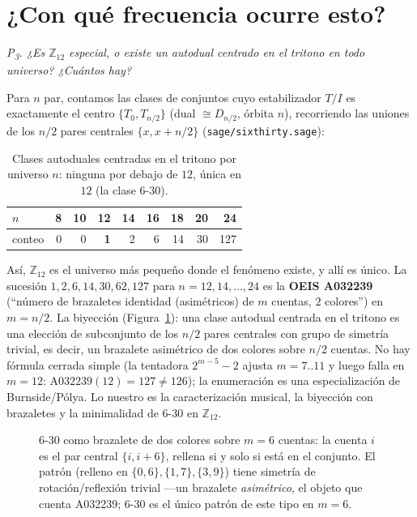 \documentclass[11pt]{article}
\newcommand{\lean}[1]{\texttt{#1}}
\newcommand{\Ztwelve}{\mathbb{Z}_{12}}
\newcommand{\Dgrp}[1]{D_{#1}}
\newcommand{\question}[1]{\smallskip\noindent\textit{#1}\smallskip}
\begin{document}
\section{¿Con qué frecuencia ocurre esto?}\label{sec:enum}

\question{P\textsubscript{3}. ¿Es $\Ztwelve$ especial, o existe un autodual centrado en el tritono en
todo universo? ¿Cuántos hay?}

Para $n$ par, contamos las clases de conjuntos cuyo estabilizador $T/I$ es exactamente el centro
$\{T_0,T_{n/2}\}$ (dual $\cong\Dgrp{n/2}$, órbita $n$), recorriendo las uniones de los $n/2$ pares
centrales $\{x,x+n/2\}$ (\lean{sage/sixthirty.sage}):

\begin{table}[h]
\centering
{}
\begin{tabular}{lrrrrrrrr}
\toprule
\rowcolor{ctA!22}
$n$    & 8 & 10 & \textbf{12} & 14 & 16 & 18 & 20 & 24\\
\midrule
conteo & 0 & 0  & \textbf{1}  & 2  & 6  & 14 & 30 & 127\\
\bottomrule
\end{tabular}
\caption{Clases autoduales centradas en el tritono por universo $n$: ninguna por debajo de $12$, única en
$12$ (la clase 6-30).}
\label{tab:counts}
\end{table}

Así, $\Ztwelve$ es el universo más pequeño donde el fenómeno existe, y allí es único. La sucesión
$1,2,6,14,30,62,127$ para $n=12,14,\dots,24$ es la \textbf{OEIS A032239} (``número de brazaletes
identidad (asimétricos) de $m$ cuentas, $2$ colores'') en $m=n/2$. La biyección
(Figura~\ref{fig:bracelet}): una clase autodual centrada en el tritono es una elección de subconjunto de
los $n/2$ pares centrales con grupo de simetría trivial, es decir, un brazalete asimétrico de dos colores
sobre $n/2$ cuentas. No hay fórmula cerrada simple (la tentadora $2^{m-5}-2$ ajusta $m=7..11$ y luego
falla en $m=12$: $\mathrm{A}032239(12)=127\ne126$); la enumeración es una especialización de
Burnside/Pólya. Lo nuestro es la caracterización musical, la biyección con brazaletes y la minimalidad de
6-30 en $\Ztwelve$.

\begin{figure}[h]
\centering
{}
\caption{6-30 como brazalete de dos colores sobre $m=6$ cuentas: la cuenta $i$ es el par central
$\{i,i+6\}$, rellena si y solo si está en el conjunto. El patrón (relleno en $\{0,6\},\{1,7\},\{3,9\}$)
tiene simetría de rotación/reflexión trivial ---un brazalete \emph{asimétrico}, el objeto que cuenta
A032239; 6-30 es el único patrón de este tipo en $m=6$.}
\label{fig:bracelet}
\end{figure}
\end{document}
